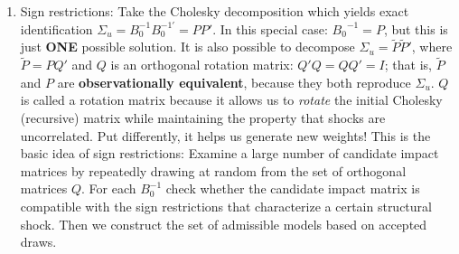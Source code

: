 \begin{enumerate}
\begin{enumerate}
\item
Sign restrictions: Take the Cholesky decomposition which yields exact identification \(\Sigma_u = B_0^{-1}B_0^{-1'} = P P'\).
In this special case: \({B_0}^{-1}=P\), but this is just \textbf{ONE} possible solution.
It is also possible to decompose \(\Sigma_u = \tilde{P}\tilde{P}'\), where \(\tilde{P} = PQ'\) and \(Q\) is an orthogonal rotation matrix: \(Q'Q = QQ'=I\);
  that is, \(\tilde{P}\) and \(P\) are \textbf{observationally equivalent}, because they both reproduce \(\Sigma_u\).
\(Q\) is called a rotation matrix because it allows us to \emph{rotate} the initial Cholesky (recursive) matrix while maintaining the property that shocks are uncorrelated.
Put differently, it helps us generate new weights!
This is the basic idea of sign restrictions:
Examine a large number of candidate impact matrices by repeatedly drawing at random from the set of orthogonal matrices \(Q\).
For each \(B_0^{-1}\) check whether the candidate impact matrix is compatible with the sign restrictions that characterize a certain structural shock.
Then we construct the set of admissible models based on accepted draws.

\end{enumerate}

\end{enumerate}